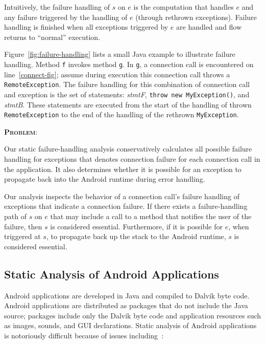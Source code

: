Intuitively, the failure handling of $s$ on $e$ is the computation
that handles $e$ and any failure triggered by the handling of $e$
(through rethrown exceptions).  Failure handling is finished when all
exceptions triggered by $e$ are handled and flow returns to ``normal''
execution.  

Figure~\ref{fig:failure-handling} lists a small Java example to
illustrate failure handling.  Method \lstinline!f! invokes method
\lstinline!g!.  In \lstinline!g!, a connection call is encountered on
line~\ref{connect-fig}; assume during execution this connection call
throws a \lstinline!RemoteException!.  The failure handling for this
combination of connection call and exception is the set of statements:
{\it stmtF}, \lstinline!throw new MyException()!, and {\it stmtB}.
These statements are executed from the start of the handling of thrown
\lstinline!RemoteException! to the end of the handling of the rethrown
\lstinline!MyException!.

\noindent\textsc{\bfseries{Problem}}: 

Our static failure-handling analysis conservatively calculates all
possible failure handling for exceptions that denotes connection
failure for each connection call in the application.  It also
determines whether it is possible for an exception to propagate back
into the Android runtime during error handling. 

Our analysis inspects the behavior of a connection call's failure
handling of exceptions that indicate a connection failure.  If there
exists a failure-handling path of $s$ on $e$ that may include a call
to a method that notifies the user of the failure, then $s$ is
considered essential.  Furthermore, if it is possible for $e$, when
triggered at $s$, to propagate back up the stack to the Android
runtime, $s$ is considered essential.


\subsection{Static Analysis of Android Applications}

Android applications are developed in Java and compiled to Dalvik byte
code.  Android applications are distributed as packages that do not
include the Java source; packages include only the Dalvik byte code
and application resources such as images, sounds, and GUI
declarations.  Static analysis of Android applications is notoriously
difficult because of issues including~\cite{Gordon:Kim:Perkins:Gilham:Nguyen:Rinard:NDSS15}: 


